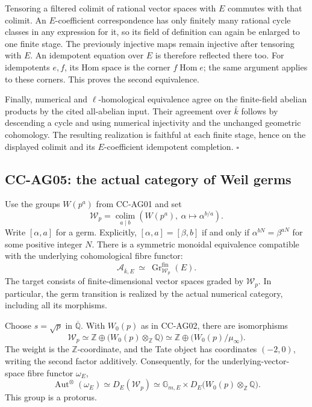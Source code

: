 Tensoring a filtered colimit of rational vector spaces with \(E\)
commutes with that colimit. An \(E\)-coefficient correspondence has
only finitely many rational cycle classes in any expression for it,
so its field of definition can again be enlarged to one finite
stage. The previously injective maps remain injective after
tensoring with \(E\). An idempotent equation over \(E\) is therefore
reflected there too. For idempotents \(e,f\), its Hom space is the
corner \(f\operatorname{Hom}e\); the same argument applies to these
corners. This proves the second equivalence.

Finally, numerical and \(\ell\)-homological equivalence agree on
the finite-field abelian products by the cited all-abelian input.
Their agreement over \(\bar k\) follows by descending a cycle and
using numerical injectivity and the unchanged geometric
cohomology. The resulting realization is faithful at each finite
stage, hence on the displayed colimit and its \(E\)-coefficient
idempotent completion. \(\square\)

\subsection{CC-AG05: the actual category of Weil germs}

Use the groups \(W(p^a)\) from CC-AG01 and set
\[
 \mathcal W_p=\underset{a\mid b}{\operatorname{colim}}
 \left(W(p^a),\ \alpha\longmapsto\alpha^{b/a}\right).
                                                        \tag{CC-AG.8}
\]
Write \([\alpha,a]\) for a germ. Explicitly,
\([\alpha,a]=[\beta,b]\) if and only if
\(\alpha^{bN}=\beta^{aN}\) for some positive integer \(N\).
There is a symmetric monoidal equivalence compatible with the
underlying cohomological fibre functor:
\[
 \mathcal A_{\bar k,E}\ \simeq\
 \operatorname{Gr}^{\mathrm{fin}}_{\mathcal W_p}(E).
                                                        \tag{CC-AG.9}
\]
The target consists of finite-dimensional vector spaces graded by
\(\mathcal W_p\). In particular, the germ transition is realized by
the actual numerical category, including all its morphisms.

Choose \(s=\sqrt p\) in \(\overline{\mathbb Q}\). With
\(W_0(p)\) as in CC-AG02, there are isomorphisms
\[
 \mathcal W_p
 \simeq \mathbb Z\oplus\bigl(W_0(p)\otimes_{\mathbb Z}\mathbb Q\bigr)
 \simeq \mathbb Z\oplus\bigl(W_0(p)/\mu_\infty\bigr).
                                                        \tag{CC-AG.10}
\]
The weight is the \(\mathbb Z\)-coordinate, and the Tate object
has coordinates \((-2,0)\), writing the second factor additively.
Consequently, for the underlying-vector-space fibre functor
\(\omega_E\),
\[
 \operatorname{Aut}^{\otimes}(\omega_E)
 \simeq D_E(\mathcal W_p)
 \simeq \mathbb G_{m,E}\times
 D_E\bigl(W_0(p)\otimes_{\mathbb Z}\mathbb Q\bigr). \tag{CC-AG.11}
\]
This group is a protorus.


